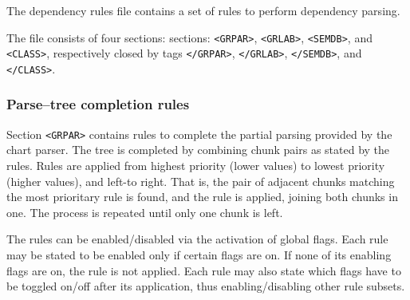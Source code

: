 \documentclass[a4paper]{book}
\begin{document}
  The dependency rules file contains a set of rules to perform dependency parsing.

  The file consists of four sections:
  sections: \verb#<GRPAR>#, \verb#<GRLAB>#, \verb#<SEMDB>#, and \verb#<CLASS>#,
  respectively closed by tags \verb#</GRPAR>#, \verb#</GRLAB>#, \verb#</SEMDB>#, and \verb#</CLASS>#.

\subsubsection{Parse--tree completion rules}

  Section \verb#<GRPAR># contains rules to complete the
    partial parsing provided by the chart parser. The tree is
    completed by combining chunk pairs as stated by the rules. Rules
    are applied from highest priority (lower values) to lowest
    priority (higher values), and left-to right.
    That is, the pair of adjacent chunks matching the most prioritary
    rule is found, and the rule is applied, joining both chunks in
    one. The process is repeated until only one chunk is left.

    The rules can be enabled/disabled via the activation of global flags.
    Each rule may be stated to be enabled only if certain flags are on. 
    If none of its enabling flags are on, the rule is not applied.
    Each rule may also state which flags have to be toggled on/off after
    its application, thus enabling/disabling other rule subsets.
    \medskip
\end{document}
